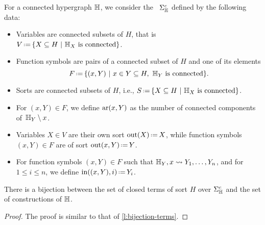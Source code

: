 \begin{definition}
  For a connected hypergraph ${\mathbb H}$, we consider the ~$\Sigma_{\mathbb H}^c$ defined by the following data:
  \begin{itemize}
    \item Variables are connected subsets of $H$, that is $V\eqdef \{ X \subseteq H \ | \ \hyper{H}_{X} \text{ is connected}\}$. 
    \item Function symbols are pairs of a connected subset of $H$ and one of its elements 
    $$F\eqdef \{(x,Y) \ | \ x \in Y \subseteq H, \ \hyper{H}_Y \text{ is connected}\}.$$
    \item Sorts are connected subsets of $H$, i.e., 
    $S\eqdef \{ X \subseteq H \ | \ \hyper{H}_X \text{ is connected}\}$.
    \item For $(x,Y) \in F$, we define $\mathrm{ar}(x,Y)$ as the number of connected components of~${\mathbb H}_Y\setminus {x}$.
    \item Variables $X \in V$ are their own sort $\outsort(X)\eqdef X$, while function symbols~$(x,Y) \in F$ are of sort $\outsort(x,Y)\eqdef Y$.
    \item For function symbols $(x,Y) \in F$ such that ${\mathbb H}_Y,x \leadsto Y_1,\ldots,Y_n$, and for $1 \leq i \leq n$, we define $\insort((x,Y),i)\eqdef Y_i$.
  \end{itemize}
\end{definition}

\begin{lemma} 
  \label{l:bijection-constructions}
  There is a bijection between the set of closed terms of  sort $H$ over $\Sigma_{\mathbb H}^c$ and the set of constructions of ${\mathbb H}$.
\end{lemma}

\begin{proof}
  The proof is similar to that of \cref{l:bijection-terms}.
\end{proof}
%


